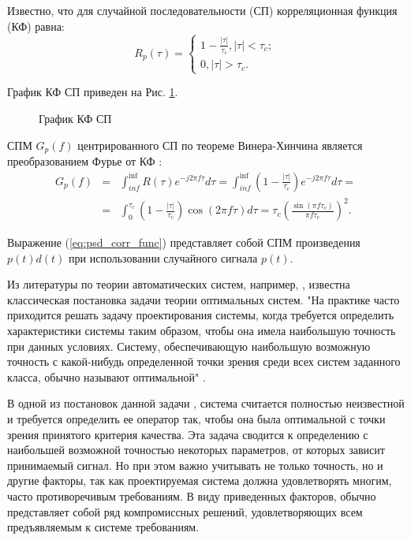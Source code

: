 Известно, что для случайной последовательности (СП) корреляционная функция (КФ) равна:
\begin{equation}
	\label{eq:cdma_ca_corr_func}
	 R_p(\tau) = \begin{cases}
		1 - \frac{|\tau|}{\tau_c}, |\tau| < \tau_c; \\
		0, |\tau| > \tau_c.
		\end{cases}
\end{equation}

График КФ СП приведен на Рис. \ref{pic:cf_code}.
\begin{figure}[h]
	\center{}
	\caption{График КФ СП} 
	\label{pic:cf_code}
\end{figure}

СПМ ${G_p(f)}$ центрированного СП по теореме Винера-Хинчина является преобразованием Фурье
от КФ \cite{borisovBook}:
\begin{align}
	\label{eq:psd_corr_func}
	G_p(f) & = & \int^{\inf}_{inf} R(\tau)e^{-j2\pi f \tau} d\tau = \int^{\inf}_{inf} \left( 1 - \frac{|\tau|}{\tau_c} \right) e^{-j2\pi f \tau} d\tau = \nonumber \\
		& = & \int^{\tau_c}_{0}\left( 1 - \frac{|\tau|}{\tau_c} \right) \cos{(2\pi f \tau)} d\tau = \tau_c \left( \frac{\sin{(\pi f \tau_c)}}{\pi f \tau_c} \right)^2.
\end{align}

Выражение (\ref{eq:psd_corr_func}) представляет собой СПМ произведения ${p(t)d(t)}$ при использовании случайного сигнала ${p(t)}$.

Из литературы по теории автоматических систем, например, \cite{pugachev}, известна классическая постановка
задачи теории оптимальных систем. "На практике часто приходится решать задачу проектирования системы, когда
требуется определить характеристики системы таким образом, чтобы она имела наибольшую точность при данных условиях.
Систему, обеспечивающую наибольшую возможную точность с какой-нибудь определенной точки зрения среди всех систем
заданного класса, обычно называют оптимальной" \cite{pugachev}.

В одной из постановок данной задачи \cite{pugachev}, система считается полностью неизвестной
и требуется определить ее оператор так, чтобы она была оптимальной с точки зрения принятого критерия качества. Эта
задача сводится к определению с наибольшей возможной точностью некоторых параметров, от которых зависит принимаемый
сигнал. Но при этом важно учитывать не только точность, но и другие факторы, так как проектируемая система должна
удовлетворять многим, часто противоречивым требованиям. В виду приведенных факторов, обычно представляет собой
ряд компромиссных решений, удовлетворяющих всем предъявляемым к системе требованиям.

